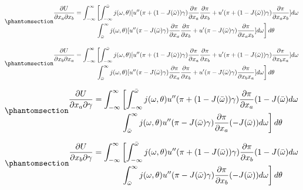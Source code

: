 \documentclass[
  letterpaper,
  DIV=11,
  numbers=noendperiod]{scrartcl}
\theoremstyle{plain}
\theoremstyle{plain}
\theoremstyle{remark}
\begin{document}
\begin{equation}\phantomsection\label{eq-crossl}{
\begin{aligned}
\frac{\partial U}{\partial x_a \partial x_b}=\int^\infty_{-\infty}&\left[ \int^{\bar \omega}_{-\infty}j(\omega,\theta)[u''(\pi+(1-J(\bar \omega))\gamma)\frac{\partial\pi}{\partial x_a}\frac{\partial \pi}{\partial x_b}+u'(\pi+(1-J(\bar \omega))\gamma)\frac{\partial \pi}{\partial x_a x_b}]d\omega \right. \\
& \left.\int^\infty_{\bar \omega}j(\omega,\theta)[u''(\pi-J(\bar \omega)\gamma)\frac{\partial\pi}{\partial x_a}\frac{\partial \pi}{\partial x_b}+u'(\pi-J(\bar \omega)\gamma)\frac{\partial \pi}{\partial x_a x_b}]d\omega\right]d\theta
\end{aligned}
}\end{equation}

\begin{equation}\phantomsection\label{eq-crossk}{
\begin{aligned}
\frac{\partial U}{\partial x_b \partial x_a}=\int^\infty_{-\infty}&\left[ \int^{\bar \omega}_{-\infty}j(\omega,\theta)[u''(\pi+(1-J(\bar \omega))\gamma)\frac{\partial\pi}{\partial x_a}\frac{\partial \pi}{\partial x_b}+u'(\pi+(1-J(\bar \omega))\gamma)\frac{\partial \pi}{\partial x_b x_a}]d\omega \right. \\
& \left.\int^\infty_{\bar \omega}j(\omega,\theta)[u''(\pi-J(\bar \omega)\gamma)\frac{\partial\pi}{\partial x_a}\frac{\partial \pi}{\partial x_b}+u'(\pi-J(\bar \omega)\gamma)\frac{\partial \pi}{\partial x_b x_a}]d\omega\right]d\theta
\end{aligned}
}\end{equation}

\begin{equation}\phantomsection\label{eq-kgam}{
\begin{aligned}
\frac{\partial U}{\partial x_a \partial \gamma}=\int^\infty_{-\infty}&\left[ \int^{\bar \omega}_{-\infty}j(\omega,\theta)u''(\pi+(1-J(\bar \omega))\gamma)\frac{\partial\pi}{\partial x_a}(1-J(\bar \omega)d\omega \right. \\
& \left.\int^\infty_{\bar \omega}j(\omega,\theta)u''(\pi-J(\bar \omega)\gamma)\frac{\partial\pi}{\partial x_a}(-J(\bar \omega))d\omega\right]d\theta
\end{aligned}
}\end{equation}

\begin{equation}\phantomsection\label{eq-lgam}{
\begin{aligned}
\frac{\partial U}{\partial x_b \partial \gamma}=\int^\infty_{-\infty}&\left[ \int^{\bar \omega}_{-\infty}j(\omega,\theta)u''(\pi+(1-J(\bar \omega))\gamma)\frac{\partial\pi}{\partial x_b}(1-J(\bar \omega)d\omega \right. \\
&\left.\int^\infty_{\bar \omega}j(\omega,\theta)u''(\pi-J(\bar \omega)\gamma)\frac{\partial\pi}{\partial x_b}(-J(\bar \omega))d\omega\right]d\theta
\end{aligned}
}\end{equation}
\end{document}
